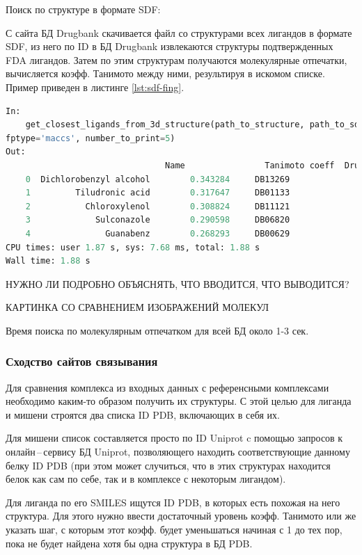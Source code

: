 \documentclass[a4paper,14pt]{article}         %
\begin{document}
Поиск по структуре в формате SDF:

С сайта БД Drugbank скачивается файл со структурами всех лигандов в формате SDF, из него по ID в БД Drugbank извлекаются структуры подтвержденных FDA лигандов. Затем по этим структурам получаются молекулярные отпечатки, вычисляется коэфф. Танимото между ними, результируя в искомом списке. Пример приведен в листинге \ref{lst:sdf-fing}.

\begin{lstlisting}[language=Python, label={lst:sdf-fing}, caption={Сходство лигандов по топологическим молекулярным отпечаткам с помощью ПМ Open Babel для входных данных~--- SDF структуры молекулы.}]
In: 
	get_closest_ligands_from_3d_structure(path_to_structure, path_to_sdf_approved, root,
fptype='maccs', number_to_print=5)
Out:
								Name  				Tanimoto coeff 	Drugbank ID  	Fingerprint_type
	0  Dichlorobenzyl alcohol        0.343284     DB13269              fp2
	1         Tiludronic acid        0.317647     DB01133              fp2
	2           Chloroxylenol        0.308824     DB11121              fp2
	3             Sulconazole        0.290598     DB06820              fp2
	4               Guanabenz        0.268293     DB00629              fp2
CPU times: user 1.87 s, sys: 7.68 ms, total: 1.88 s
Wall time: 1.88 s
\end{lstlisting}
\color{orange} НУЖНО ЛИ ПОДРОБНО ОБЪЯСНЯТЬ, ЧТО ВВОДИТСЯ, ЧТО ВЫВОДИТСЯ?
\color{black}

\color{orange} КАРТИНКА СО СРАВНЕНИЕМ ИЗОБРАЖЕНИЙ МОЛЕКУЛ
\color{black}

Время поиска по молекулярным отпечатком для всей БД около 1-3 сек.
\subsubsection{Сходство сайтов связывания}
Для сравнения комплекса из входных данных с референсными комплексами необходимо каким-то образом получить их структуры. С этой целью для лиганда и мишени строятся два списка ID PDB, включающих в себя их. 

Для мишени список составляется просто по ID Uniprot c помощью запросов к онлайн\,--\,сервису БД Uniprot, позволяющего находить соответствующие данному белку ID PDB (при этом может случиться, что в этих структурах находится белок как сам по себе, так и в комплексе с некоторым лигандом). 

Для лиганда по его SMILES ищутся ID PDB, в которых есть похожая на него структура. Для этого нужно ввести достаточный уровень коэфф. Танимото или же указать шаг, с которым этот коэфф. будет уменьшаться начиная с 1 до тех пор, пока не будет найдена хотя бы одна структура в БД PDB.
\end{document}
